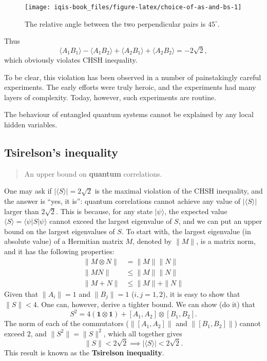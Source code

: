 \documentclass[fleqn]{article}
\newenvironment{idea}{\noindent}{\medskip}
\begin{document}
\begin{figure}[H]

{\centering \texttt{[image: iqis-book\_files/figure-latex/choice-of-as-and-bs-1]} 

}

\caption{The relative angle between the two perpendicular pairs is \(45^\circ\).}\label{fig:choice-of-as-and-bs}
\end{figure}

Thus
\[
  \langle A_1 B_1\rangle - \langle A_1 B_2\rangle + \langle A_2 B_1\rangle + \langle A_2 B_2\rangle
  = -2\sqrt{2},
\]
which obviously violates CHSH inequality.

To be clear, this violation has been observed in a number of painstakingly careful experiments.
The early efforts were truly heroic, and the experiments had many layers of complexity.
Today, however, such experiments are routine.

\begin{idea}
The behaviour of entangled quantum systems cannot be explained by any local hidden variables.

\end{idea}

\hypertarget{tsirelsons-inequality}{%
\subsection{Tsirelson's inequality}\label{tsirelsons-inequality}}

\begin{quote}
An upper bound on \textbf{quantum} correlations.
\end{quote}

One may ask if \(|\langle S\rangle|= 2\sqrt{2}\) is the maximal violation of the CHSH inequality, and the answer is ``yes, it is'': quantum correlations cannot achieve any value of \(|\langle S\rangle|\) larger than \(2\sqrt{2}\).
This is because, for any state \(|\psi\rangle\), the expected value \(\langle S\rangle = \langle\psi|S|\psi\rangle\) cannot exceed the largest eigenvalue of \(S\), and we can put an upper bound on the largest eigenvalues of \(S\).
To start with, the largest eigenvalue (in absolute value) of a Hermitian matrix \(M\), denoted by \(\|M\|\), is a matrix norm, and it has the following properties:
\[
\begin{aligned}
  \|M\otimes N\|
  & = \|M\| \|N\|
\\\|MN\|
  & \leqslant\|M\| \|N\|
\\\|M+N\|
  & \leqslant\|M\| + \|N\|
\end{aligned}
\]
Given that \(\|A_i\|=1\) and \(\|B_j\|=1\) (\(i,j=1,2\)), it is easy to show that \(\|S\| < 4\).
One can, however, derive a tighter bound.
We can show (do it) that
\[
  S^2
  = 4(\mathbf{1}\otimes\mathbf{1}) + [A_1,A_2]\otimes[B_1,B_2].
\]
The norm of each of the commutators (\(\|[A_1, A_2]\|\) and \(\|[B_1, B_2]\|\)) cannot exceed \(2\), and \(\|S^2\|=\|S\|^2\), which all together gives
\[
  \|S\|
  < 2\sqrt{2}
  \implies
  |\langle S\rangle| < 2\sqrt{2}.
\]
This result is known as the \textbf{Tsirelson inequality}.
\end{document}
